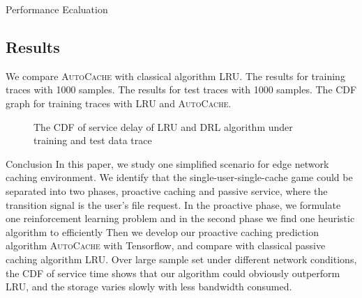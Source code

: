 \documentclass{article}
\begin{document}
\begin{section}{Performance Ecaluation}
    \subsection{Results}
    We compare \textsc{AutoCache} with classical algorithm LRU.
    The results for training traces with 1000 samples.
    The results for test traces with 1000 samples.
    The CDF graph for training traces with LRU and \textsc{AutoCache}.
    \begin{figure}[htp]
        \centering
        \hfill
        \caption{The CDF of service delay of LRU and DRL algorithm under training and test data trace}
    \end{figure}
\end{section}

\begin{section}{Conclusion}
    \label{summary}
    In this paper, we study one simplified scenario for edge network caching environment. We identify that the single-user-single-cache game could be separated into two phases, proactive caching and passive service, where the transition signal is the user's file request. In the proactive phase, we formulate one reinforcement learning problem and in the second phase we find one heuristic algorithm to efficiently 
    Then we develop our proactive caching prediction algorithm \textsc{AutoCache} with Tensorflow, and compare with classical passive caching algorithm LRU. Over large sample set under different network conditions, the CDF of service time shows that our algorithm could obviously outperform LRU, and the storage varies slowly with less bandwidth consumed.
\end{section}




\end{document}
